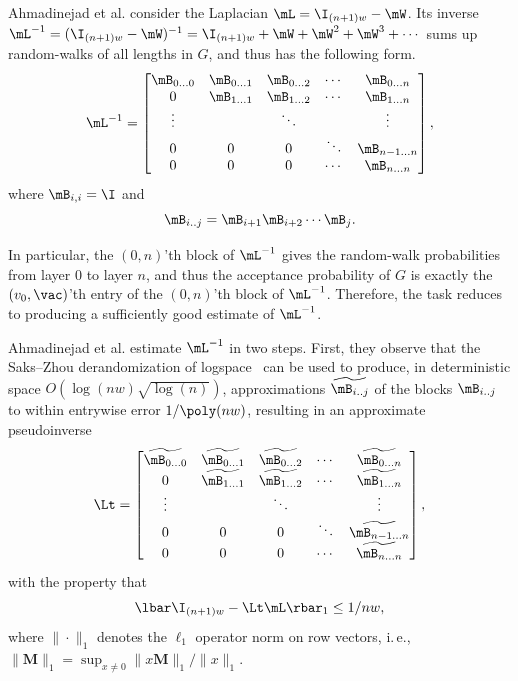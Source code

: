 \documentclass[11pt]{article}
\newcommand{\ie}{i.\,e.}
\begin{document}
%
Ahmadinejad  %
et al. consider the Laplacian $\mL = \I_{(n+1)w} - \mW$.  Its
   inverse $\mL^{-1} = (\I_{(n+1)w}-\mW)^{-1} = \I_{(n+1)w}+\mW+\mW^2+\mW^3+\cdots$ sums up random-walks of all lengths in $G$, and thus has the following form. %
   $$\mL^{-1} =
   \begin{bmatrix}
    \mB_{0\ldots0} & \mB_{0\ldots 1} & \mB_{0\ldots 2} & \cdots & \mB_{0\ldots n} \\
    0 & \mB_{1\ldots 1} & \mB_{1\ldots 2} & \cdots & \mB_{1\ldots n} \\
    \vdots & & \ddots & & \vdots\\
    0 & 0 & 0 & \ddots & \mB_{n-1\ldots n}\\
    0 & 0 & 0 & \cdots &  \mB_{n\ldots n} \\
    \end{bmatrix},$$
   where $\mB_{i,i}=\I$ and 
   $$\mB_{i .. j} = \mB_{i+1}\mB_{i+2}\cdots \mB_j.$$
   
   In particular, the $(0,n)$'th block of $\mL^{-1}$ gives the random-walk
   probabilities from layer $0$ to layer $n$, and thus the acceptance probability
   of $G$ is exactly the $(v_0,\vac)$'th entry of the $(0,n)$'th block of $\mL^{-1}$.  Therefore, the task reduces to producing a sufficiently good estimate of $\mL^{-1}$.
   
%
Ahmadinejad  %
et al. estimate $\mL^{-1}$  in two steps.  First, they observe that the Saks--Zhou derandomization of logspace~\cite{SaksZh99} can be used to produce,
   in deterministic space $O(\log(nw)\sqrt{\log(n)})$, %
   approximations %
   $\widetilde{\mB_{i .. j}}$ of the blocks $\mB_{i .. j}$ to within entrywise error $1/\poly(nw)$, resulting in an approximate pseudoinverse
   \begin{equation}
       \Lt =
   \begin{bmatrix}
    \widetilde{\mB_{0\ldots0}} & \widetilde{\mB_{0\ldots 1}} & \widetilde{\mB_{0\ldots 2}} & \cdots & \widetilde{\mB_{0\ldots n}} \\
    0 & \widetilde{\mB_{1\ldots 1}} & \widetilde{\mB_{1\ldots 2}} & \cdots & \widetilde{\mB_{1\ldots n}} \\
    \vdots & & \ddots & & \vdots\\
    0 & 0 & 0 & \ddots & \widetilde{\mB_{n-1\ldots n}}\\
    0 & 0 & 0 & \cdots &  \widetilde{\mB_{n\ldots n}} \\
    \end{bmatrix},\label{eqn:path-inverse}
   \end{equation}
   with the property that
   $$\lbar \I_{(n+1)w}-\Lt \mL\rbar_{1}\leq 1/nw,$$
   where $\|\cdot\|_1$ denotes the $\ell_1$ operator norm on row vectors, \ie, $\|\mathbf{M}\|_1 =\sup_{x\neq 0}\|x\mathbf{M}\|_{1}/\|x\|_{1}$.
\end{document}
